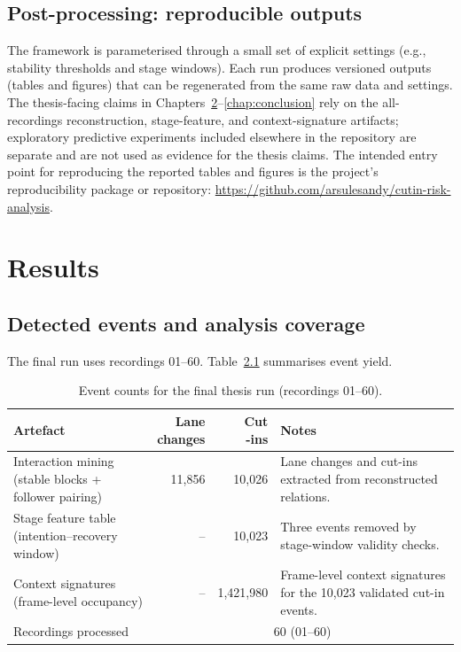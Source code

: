 \documentclass[12pt,a4paper,twoside,openright]{report}
\newcommand{\ArtifactURL}{\url{https://github.com/arsulesandy/cutin-risk-analysis}}
\begin{document}
    \section{Post-processing: reproducible outputs}
    The framework is parameterised through a small set of explicit settings (e.g., stability thresholds and stage windows). Each run produces versioned outputs (tables and figures) that can be regenerated from the same raw data and settings. The thesis-facing claims in Chapters~\ref{chap:results}--\ref{chap:conclusion} rely on the all-recordings reconstruction, stage-feature, and context-signature artifacts; exploratory predictive experiments included elsewhere in the repository are separate and are not used as evidence for the thesis claims. The intended entry point for reproducing the reported tables and figures is the project's reproducibility package or repository: \ArtifactURL.

    \chapter{Results}
    \label{chap:results}

    \section{Detected events and analysis coverage}
    The final run uses recordings 01--60. Table~\ref{tab:events} summarises event yield.

    \begin{table}[H]
        \centering
        \caption{Event counts for the final thesis run (recordings 01--60).}
        \label{tab:events}
        {\small
        \setlength{\tabcolsep}{4pt}
            \begin{tabularx}{\textwidth}{@{}>{\raggedright\arraybackslash}p{}rr>{\raggedright\arraybackslash}p{}@{}}
\toprule
Artefact & \shortstack{Lane\\changes} & \shortstack{Cut\\-ins} & Notes \\
\midrule
Interaction mining (stable blocks + follower pairing) & 11,856 & 10,026 & Lane changes and cut-ins extracted from reconstructed relations. \\
Stage feature table (intention--recovery window) & -- & 10,023 & Three events removed by stage-window validity checks. \\
Context signatures (frame-level occupancy) & -- & 1,421,980 & Frame-level context signatures for the 10,023 validated cut-in events. \\
\midrule
Recordings processed & \multicolumn{3}{c}{60 (01--60)} \\
\bottomrule
            \end{tabularx}
        }
    \end{table}
\end{document}

